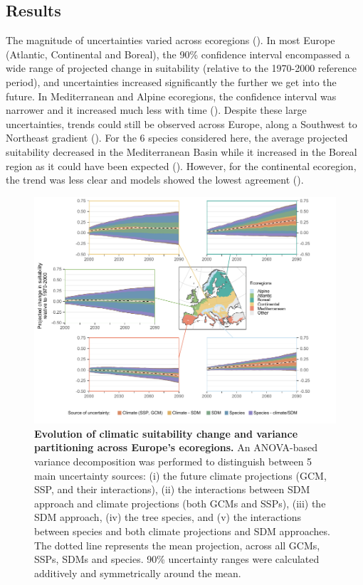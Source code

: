 \subsection{Results}

The magnitude of uncertainties varied across ecoregions (). In most Europe (Atlantic, Continental and Boreal), the 90\% confidence interval encompassed a wide range of projected change in suitability (relative to the 1970-2000 reference period), and uncertainties increased significantly the further we get into the future. In Mediterranean and Alpine ecoregions, the confidence interval was narrower and it increased much less with time (). Despite these large uncertainties, trends could still be observed across Europe, along a Southwest to Northeast gradient (). For the 6 species considered here, the average projected suitability decreased in the Mediterranean Basin while it increased in the Boreal region as it could have been expected (). However, for the continental ecoregion, the trend was less clear and models showed the lowest agreement ().

\begin{figure}[H]
\vspace*{0cm}
\centering
\includegraphics{chapter4/figs/anova_across_species_byecoregion-1.pdf}
\caption{\textbf{Evolution of climatic suitability change and variance partitioning across Europe's ecoregions.} An ANOVA-based variance decomposition was performed to distinguish between 5 main uncertainty sources: (i) the future climate projections (GCM, SSP, and their interactions), (ii) the interactions between SDM approach and climate projections (both GCMs and SSPs), (iii) the SDM approach, (iv) the tree species, and (v) the interactions between species and both climate projections and SDM approaches. The dotted line represents the mean projection, across all GCMs, SSPs, SDMs and species. 90\% uncertainty ranges were calculated additively and symmetrically around the mean.}
\label{fig:anovaecoregions}
\vspace*{0cm}
\end{figure}

